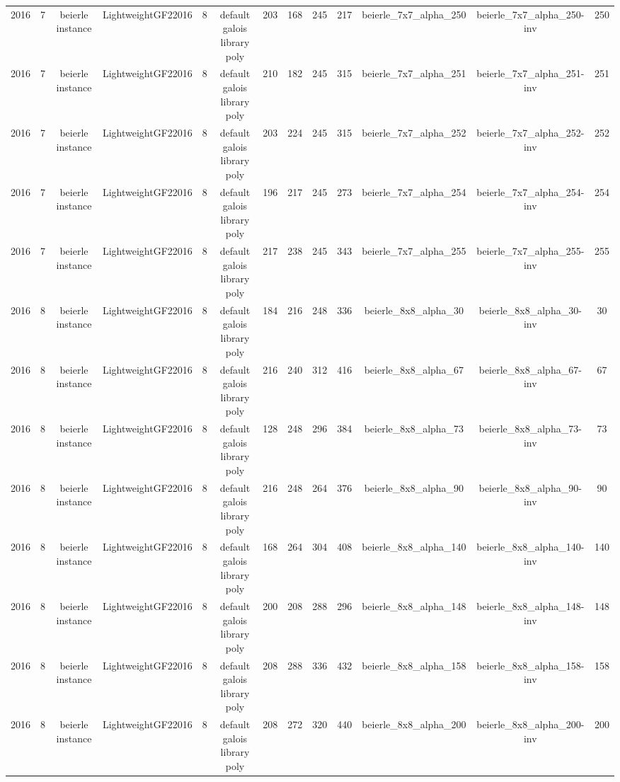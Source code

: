 \begin{tabular}{c c c c c c c c c c c c c}
2016 & 7 & beierle instance & LightweightGF22016 & 8 & default galois library poly & 203 & 168 & 245 & 217 & beierle_7x7_alpha_250 & beierle_7x7_alpha_250-inv & 250 \\
2016 & 7 & beierle instance & LightweightGF22016 & 8 & default galois library poly & 210 & 182 & 245 & 315 & beierle_7x7_alpha_251 & beierle_7x7_alpha_251-inv & 251 \\
2016 & 7 & beierle instance & LightweightGF22016 & 8 & default galois library poly & 203 & 224 & 245 & 315 & beierle_7x7_alpha_252 & beierle_7x7_alpha_252-inv & 252 \\
2016 & 7 & beierle instance & LightweightGF22016 & 8 & default galois library poly & 196 & 217 & 245 & 273 & beierle_7x7_alpha_254 & beierle_7x7_alpha_254-inv & 254 \\
2016 & 7 & beierle instance & LightweightGF22016 & 8 & default galois library poly & 217 & 238 & 245 & 343 & beierle_7x7_alpha_255 & beierle_7x7_alpha_255-inv & 255 \\
2016 & 8 & beierle instance & LightweightGF22016 & 8 & default galois library poly & 184 & 216 & 248 & 336 & beierle_8x8_alpha_30 & beierle_8x8_alpha_30-inv & 30 \\
2016 & 8 & beierle instance & LightweightGF22016 & 8 & default galois library poly & 216 & 240 & 312 & 416 & beierle_8x8_alpha_67 & beierle_8x8_alpha_67-inv & 67 \\
2016 & 8 & beierle instance & LightweightGF22016 & 8 & default galois library poly & 128 & 248 & 296 & 384 & beierle_8x8_alpha_73 & beierle_8x8_alpha_73-inv & 73 \\
2016 & 8 & beierle instance & LightweightGF22016 & 8 & default galois library poly & 216 & 248 & 264 & 376 & beierle_8x8_alpha_90 & beierle_8x8_alpha_90-inv & 90 \\
2016 & 8 & beierle instance & LightweightGF22016 & 8 & default galois library poly & 168 & 264 & 304 & 408 & beierle_8x8_alpha_140 & beierle_8x8_alpha_140-inv & 140 \\
2016 & 8 & beierle instance & LightweightGF22016 & 8 & default galois library poly & 200 & 208 & 288 & 296 & beierle_8x8_alpha_148 & beierle_8x8_alpha_148-inv & 148 \\
2016 & 8 & beierle instance & LightweightGF22016 & 8 & default galois library poly & 208 & 288 & 336 & 432 & beierle_8x8_alpha_158 & beierle_8x8_alpha_158-inv & 158 \\
2016 & 8 & beierle instance & LightweightGF22016 & 8 & default galois library poly & 208 & 272 & 320 & 440 & beierle_8x8_alpha_200 & beierle_8x8_alpha_200-inv & 200 \\

\end{tabular}
